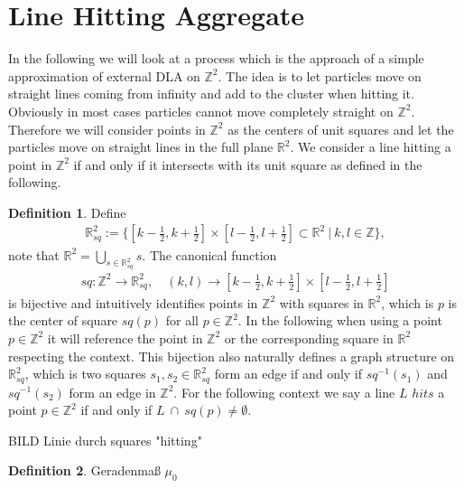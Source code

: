 \documentclass[12pt,a4paper]{scrartcl}
\numberwithin{equation}{subsection}
\numberwithin{equation}{section}
\theoremstyle{definition}
\newtheorem{definition}{Definition}[subsection]
\begin{document}
\newpage

\section{Line Hitting Aggregate}

In the following we will look at a process which is the approach of a simple approximation of external DLA on $\mathbb{Z}^2$. The idea is to let particles move on straight lines coming from infinity and add to the cluster when hitting it. Obviously in most cases particles cannot move completely straight on $\mathbb{Z}^2$. Therefore we will consider points in $\mathbb{Z}^2$ as the centers of unit squares and let the particles move on straight lines in the full plane $\mathbb{R}^2$. We consider a line hitting a point in $\mathbb{Z}^2$ if and only if it intersects with its unit square as defined in the following. 

\begin{definition}
	Define 
	\begin{align}
		\mathbb{R}^2_{sq} := \{[k - \frac{1}{2}, k + \frac{1}{2}] \times [l- \frac{1}{2}, l + \frac{1}{2}] \subset \mathbb{R}^2\ |\ k,l \in \mathbb{Z}\}, 
	\end{align} 
	note that $\mathbb{R}^2 = \bigcup_{s\in \mathbb{R}^2_{sq}} s$. The canonical function
	\begin{align}
	sq: \mathbb{Z}^2 \to \mathbb{R}^2_{sq},\quad (k,l)\to [k - \frac{1}{2}, k + \frac{1}{2}] \times [l- \frac{1}{2}, l + \frac{1}{2}]
	\end{align}
	is bijective and intuitively identifies points in $\mathbb{Z}^2$ with squares in $\mathbb{R}^2$, which is $p$ is the center of square $sq(p)$ for all $p\in \mathbb{Z}^2$. In the following when using a point $p\in \mathbb{Z}^2$ it will reference the point in $\mathbb{Z}^2$ or the corresponding square in $\mathbb{R}^2$ respecting the context. This bijection also naturally defines a graph structure on $\mathbb{R}^2_{sq}$, which is two squares $s_1, s_2\in \mathbb{R}^2_{sq}$ form an edge if and only if $sq^{-1}(s_1)$ and $sq^{-1}(s_2)$ form an edge in $\mathbb{Z}^2$. 
	\noindent For the following context we say a line $L$ $hits$ a point $p\in \mathbb{Z}^2$ if and only if $L\ \cap\ sq(p) \neq \emptyset$.
	
\end{definition}

BILD Linie durch squares "hitting"\\


\begin{definition}
	Geradenmaß $\mu_0$
\end{definition}
\end{document}
